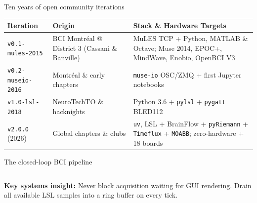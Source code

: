 \documentclass[aspectratio=169,11pt,t]{beamer}
\begin{document}
\begin{frame}{Ten years of open community iterations}
  \vspace{1mm}
  {\NTXSans\scriptsize
  \renewcommand{\arraystretch}{1.45}
  \begin{tabular}{@{}p{}p{}p{}@{}}
    \toprule
    \textbf{Iteration} & \textbf{Origin} & \textbf{Stack \& Hardware Targets} \\
    \midrule
    \texttt{v0.1-mules-2015} & BCI Montr\'eal @ District 3 (Cassani \& Banville) & MuLES TCP + Python, MATLAB \& Octave; Muse 2014, EPOC+, MindWave, Enobio, OpenBCI V3 \\
    \texttt{v0.2-museio-2016} & Montr\'eal \& early chapters & \texttt{muse-io} OSC/ZMQ + first Jupyter notebooks \\
    \texttt{v1.0-lsl-2018} & NeuroTechTO \& hacknights & Python 3.6 + \texttt{pylsl} + \texttt{pygatt} BLED112 \\
    \texttt{v2.0.0} (2026) & Global chapters \& clubs & \texttt{uv}, LSL + BrainFlow + \texttt{pyRiemann} + \texttt{Timeflux} + \texttt{MOABB}; zero-hardware + 18 boards \\
    \bottomrule
  \end{tabular}}
\end{frame}


\begin{frame}{The closed-loop BCI pipeline}
  \vspace{2mm}
  \begin{columns}[T,onlytextwidth]
  \end{columns}
  \vspace{5mm}
  {\NTXSans\scriptsize\color{NTXMuted}\textbf{Key systems insight:} Never block acquisition waiting for GUI rendering. Drain all available LSL samples into a ring buffer on every tick.\par}
\end{frame}
\end{document}
